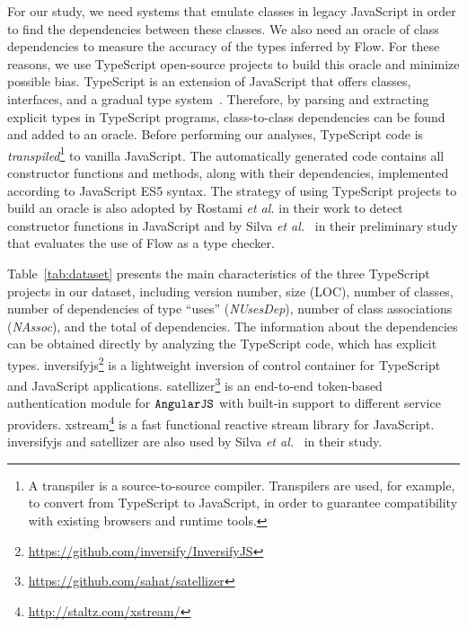 \documentclass[review]{elsarticle}
\newcommand{\aspas}[1]{{``#1''}}
\newcommand{\mcode}[1]{$\tt #1$}
\begin{document}
For our study, we need systems that emulate classes in legacy JavaScript in order to find the dependencies between these classes. We also need an oracle of class dependencies to measure the accuracy of the types inferred by Flow. For these reasons, we use TypeScript open-source projects to build this oracle and minimize possible bias. TypeScript is an extension of JavaScript that offers classes, interfaces, and a gradual type system~\cite{nance2014}. Therefore, by parsing and extracting explicit types in TypeScript programs, class-to-class dependencies can be found and added to an oracle. Before performing our analyses, TypeScript code is \textit{transpiled}\footnote{A transpiler is a source-to-source compiler. Transpilers are used, for example, to convert from TypeScript to JavaScript, in order to guarantee compatibility with existing browsers and runtime tools.} to vanilla JavaScript. The automatically generated code contains all constructor functions and methods, along with their dependencies, implemented according to JavaScript ES5 syntax. The strategy of using TypeScript projects to build an oracle is also adopted by Rostami \emph{et al.} \cite{rostami2016} in their work to detect constructor functions in JavaScript and by Silva \emph{et al.}~\cite{sanerera2017} in their preliminary study that evaluates the use of Flow as a type checker.

Table~\ref{tab:dataset} presents the main characteristics of the three TypeScript projects in our dataset, including version number, size (LOC), number of classes, number of dependencies of type \aspas{uses} (\textit{NUsesDep}), number of class associations (\textit{NAssoc}), and the total of dependencies. The information about the dependencies can be obtained directly by analyzing the TypeScript code, which has explicit types. {\sc inversifyjs}\footnote{\url{https://github.com/inversify/InversifyJS}} is a lightweight inversion of control container for TypeScript and JavaScript applications. {\sc satellizer}\footnote{\url{https://github.com/sahat/satellizer}} is an end-to-end token-based authentication module for \mcode{AngularJS} with built-in support to different service providers. {\sc xstream}\footnote{\url{http://staltz.com/xstream/}} is a fast functional reactive stream library for JavaScript. {\sc inversifyjs} and {\sc satellizer} are also used by Silva \emph{et al.}~\cite{sanerera2017} in their study.
\end{document}
